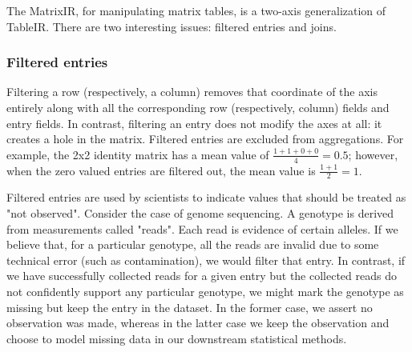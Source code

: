 \documentclass[10pt,a4paper%
]{article}
\begin{document}





The MatrixIR, for manipulating matrix tables, is a two-axis generalization of TableIR. There are two
interesting issues: filtered entries and joins.

\subsubsection{Filtered entries}

Filtering a row (respectively, a column) removes that coordinate of the axis entirely along with all
the corresponding row (respectively, column) fields and entry fields. In contrast, filtering an
entry does not modify the axes at all: it creates a hole in the matrix. Filtered entries are
excluded from aggregations. For example, the 2x2 identity matrix has a mean value of $\frac{1 + 1 +
  0 + 0}{4} = 0.5$; however, when the zero valued entries are filtered out, the mean value is
$\frac{1 + 1}{2} = 1$.

Filtered entries are used by scientists to indicate values that should be treated as "not
observed". Consider the case of genome sequencing. A genotype is derived from measurements called
"reads". Each read is evidence of certain alleles. If we believe that, for a particular genotype,
all the reads are invalid due to some technical error (such as contamination), we would filter that
entry. In contrast, if we have successfully collected reads for a given entry but the collected
reads do not confidently support any particular genotype, we might mark the genotype as missing but
keep the entry in the dataset. In the former case, we assert no observation was made, whereas in the
latter case we keep the observation and choose to model missing data in our downstream statistical
methods.
\end{document}
